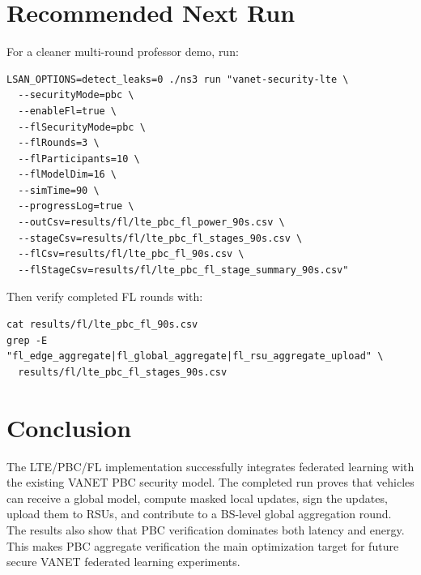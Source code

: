 \documentclass[11pt,a4paper]{article}
\begin{document}
\section{Recommended Next Run}

For a cleaner multi-round professor demo, run:

\begin{lstlisting}[style=cmdstyle,caption={Recommended three-round LTE/PBC/FL run.}]
LSAN_OPTIONS=detect_leaks=0 ./ns3 run "vanet-security-lte \
  --securityMode=pbc \
  --enableFl=true \
  --flSecurityMode=pbc \
  --flRounds=3 \
  --flParticipants=10 \
  --flModelDim=16 \
  --simTime=90 \
  --progressLog=true \
  --outCsv=results/fl/lte_pbc_fl_power_90s.csv \
  --stageCsv=results/fl/lte_pbc_fl_stages_90s.csv \
  --flCsv=results/fl/lte_pbc_fl_90s.csv \
  --flStageCsv=results/fl/lte_pbc_fl_stage_summary_90s.csv"
\end{lstlisting}

Then verify completed FL rounds with:

\begin{lstlisting}[style=cmdstyle,caption={Commands to check FL completion.}]
cat results/fl/lte_pbc_fl_90s.csv
grep -E "fl_edge_aggregate|fl_global_aggregate|fl_rsu_aggregate_upload" \
  results/fl/lte_pbc_fl_stages_90s.csv
\end{lstlisting}

\section{Conclusion}

The LTE/PBC/FL implementation successfully integrates federated learning with
the existing VANET PBC security model. The completed run proves that vehicles
can receive a global model, compute masked local updates, sign the updates,
upload them to RSUs, and contribute to a BS-level global aggregation round. The
results also show that PBC verification dominates both latency and energy. This
makes PBC aggregate verification the main optimization target for future secure
VANET federated learning experiments.
\end{document}
